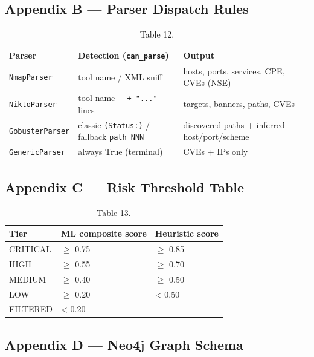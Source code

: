 \documentclass[10pt,journal,onecolumn]{IEEEtran}
\begin{document}
\subsection{Appendix B --- Parser Dispatch Rules}

\begin{table}[h]
\caption{Table 12.}
\label{tab:t12}
\begin{tabularx}{\columnwidth}{l >{\raggedright\arraybackslash}X >{\raggedright\arraybackslash}X}
\toprule
\textbf{Parser} & \textbf{Detection (\texttt{can\_parse})} & \textbf{Output}\\
\midrule
\texttt{NmapParser} & tool name / XML sniff & hosts, ports, services, CPE, CVEs (NSE)\\
\texttt{NiktoParser} & tool name + \texttt{+ "..."} lines & targets, banners, paths, CVEs\\
\texttt{GobusterParser} & classic \texttt{(Status:)} / fallback \texttt{path NNN} & discovered paths + inferred host/port/scheme\\
\texttt{GenericParser} & always True (terminal) & CVEs + IPs only\\
\bottomrule
\end{tabularx}
\end{table}

\subsection{Appendix C --- Risk Threshold Table}

\begin{table}[h]
\caption{Table 13.}
\label{tab:t13}
\begin{tabularx}{\columnwidth}{l >{\raggedright\arraybackslash}X >{\raggedright\arraybackslash}X}
\toprule
\textbf{Tier} & \textbf{ML composite score} & \textbf{Heuristic score}\\
\midrule
CRITICAL & $\geq$ 0.75 & $\geq$ 0.85\\
HIGH & $\geq$ 0.55 & $\geq$ 0.70\\
MEDIUM & $\geq$ 0.40 & $\geq$ 0.50\\
LOW & $\geq$ 0.20 & < 0.50\\
FILTERED & < 0.20 & ---\\
\bottomrule
\end{tabularx}
\end{table}

\subsection{Appendix D --- Neo4j Graph Schema}
\end{document}
